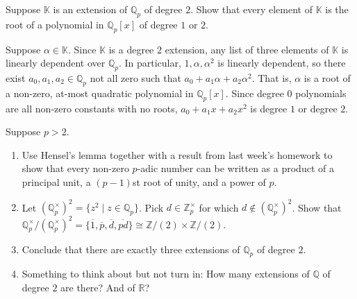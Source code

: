 \documentclass[12 pt, letterpaper]{hmcpset}
\begin{document}
\pagebreak

\begin{problem}[(2)]
	Suppose $\mathbb{K}$ is an extension of $\mathbb{Q}_{p}$ of degree $2$. Show that every element of $\mathbb{K}$ is the root of a polynomial in $\mathbb{Q}_{p}[x]$ of degree $1$ or $2$.
\end{problem}

\begin{solution}
	Suppose $\alpha \in \mathbb{K}$. Since $\mathbb{K}$ is a degree $2$ extension, any list of three elements of $\mathbb{K}$ is linearly dependent over $\mathbb{Q}_{p}$. In particular, $1, \alpha, \alpha^{2}$ is linearly dependent, so there exist $a_{0}, a_{1}, a_{2} \in \mathbb{Q}_{p}$ not all zero such that $a_{0} + a_{1} \alpha + a_{2} \alpha^{2}$. That is, $\alpha$ is a root of a non-zero, at-most quadratic polynomial in $\mathbb{Q}_{p}[x]$. Since degree $0$ polynomials are all non-zero constants with no roots, $a_{0} + a_{1} x + a_{2} x^{2}$ is degree $1$ or degree $2$.
\end{solution}

\pagebreak

\begin{problem}[(3)]
	Suppose $p > 2$.
	\begin{enumerate}
		\item Use Hensel's lemma together with a result from last week's homework to show that every non-zero $p$-adic number can be written as a product of a principal unit, a $(p - 1)$st root of unity, and a power of $p$.
		\item Let $(\mathbb{Q}_{p}^{\times})^{2} = \{ z^{2} \mid z \in \mathbb{Q}_{p} \}$. Pick $d \in \mathbb{Z}_{p}^{\times}$ for which $d \notin (\mathbb{Q}_{p}^{\times})^{2}$. Show that $\mathbb{Q}_{p}^{\times} / (\mathbb{Q}_{p}^{\times})^{2} = \{ \overline{1}, \overline{p}, \overline{d}, \overline{pd} \} \cong \mathbb{Z} / (2) \times \mathbb{Z} / (2)$.
		\item Conclude that there are exactly three extensions of $\mathbb{Q}_{p}$ of degree $2$.
		\item Something to think about but not turn in: How many extensions of $\mathbb{Q}$ of degree $2$ are there? And of $\mathbb{R}$?
	\end{enumerate}
\end{problem}
\end{document}
